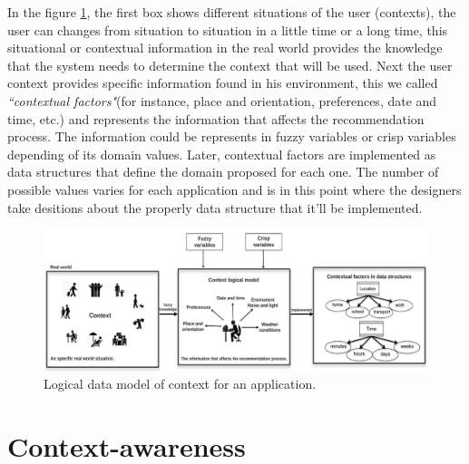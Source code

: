 In the figure \ref{fig:logicalmodel}, the first box shows different
situations of the user (contexts), the user can changes from situation
to situation in a little time or a long time, this situational or
contextual information in the real world provides the knowledge that
the system needs to determine the context that will be used.  Next the
user context provides specific information found in his environment,
this we called \textit{``contextual factors"}(for instance, place and
orientation, preferences, date and time, etc.) and represents the
information that affects the recommendation process. The information
could be represents in fuzzy variables or crisp variables depending of
its domain values. Later, contextual factors are implemented as data
structures that define the domain proposed for each one. The number of
possible values varies for each application and is in this point where
the designers take desitions about the properly data structure  that
it'll be implemented.
\begin{figure}
\captionsetup{font=footnotesize} \centering
\includegraphics[width=1.0\textwidth]{img/context-scheme.png}  
\small
\caption{Logical data model of context for an application.}
\label{fig:logicalmodel}    
\end{figure} %

\section{Context-awareness} \label{context-awareness}

